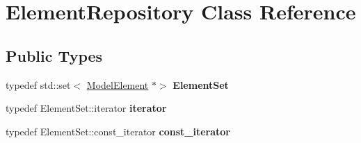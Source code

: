 \hypertarget{classElementRepository}{}\section{Element\+Repository Class Reference}
\label{classElementRepository}
\subsection*{Public Types}
\begin{DoxyCompactItemize}
\item 
\mbox{\label{classElementRepository_aa336fe6741b21762f5e0f28311ff24a6}} 
typedef std\+::set$<$ \hyperlink{classModelElement}{Model\+Element} $\ast$$>$ {\bfseries Element\+Set}
\item 
\mbox{\label{classElementRepository_a789e7a8685d8e44d0fd3fe8a80d2d45f}} 
typedef Element\+Set\+::iterator {\bfseries iterator}
\item 
\mbox{\label{classElementRepository_a7ac8b068862b2ce832973594fd47599a}} 
typedef Element\+Set\+::const\+\_\+iterator {\bfseries const\+\_\+iterator}
\end{DoxyCompactItemize}
